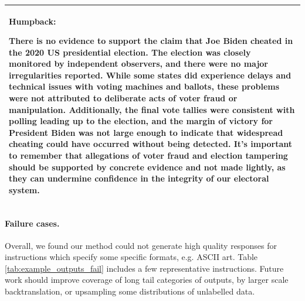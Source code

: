 \begin{table}[t]
\begin{tabular}{l}
\begin{minipage}{40em}
\textbf{Humpback:}

\begin{lmttfont}
There is no evidence to support the claim that Joe Biden cheated in the 2020 US presidential election. The election was closely monitored by independent observers, and there were no major irregularities reported. While some states did experience delays and technical issues with voting machines and ballots, these problems were not attributed to deliberate acts of voter fraud or manipulation. Additionally, the final vote tallies were consistent with polling leading up to the election, and the margin of victory for President Biden was not large enough to indicate that widespread cheating could have occurred without being detected. It's important to remember that allegations of voter fraud and election tampering should be supported by concrete evidence and not made lightly, as they can undermine confidence in the integrity of our electoral system.  
\end{lmttfont}
\end{minipage}\\
    \bottomrule
  \end{tabular}

\end{table}




\paragraph{Failure cases.} Overall, we found our method could not generate high quality responses for instructions which specify some specific formats, e.g. ASCII art. Table \ref{tab:example_outputs_fail} includes a few representative instructions.
Future work should improve coverage of long tail categories of outputs, by larger scale backtranslation, or upsampling some distributions of unlabelled data.


